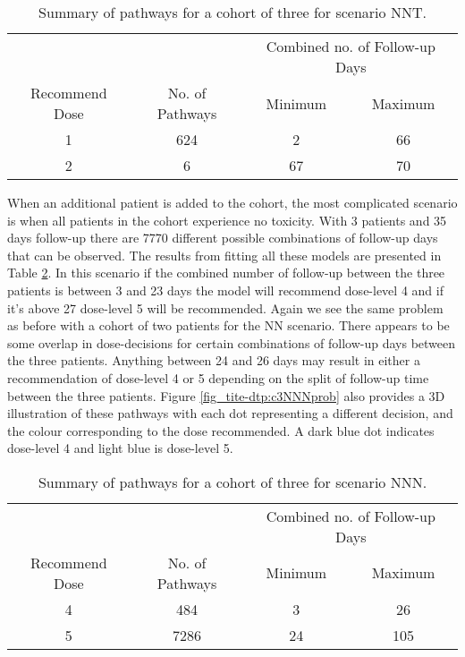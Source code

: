 \begin{table}[H]
	\centering
	\caption{Summary of pathways for a cohort of three for scenario NNT. }
	\label{tab_tite-dtp:TITEDTP_c3NNT}
	\begin{tabular}{cccc}
		\hline
		\multicolumn{1}{l}{} & \multicolumn{1}{l}{} & \multicolumn{2}{c}{Combined no. of Follow-up Days} \\ \cline{3-4} 
		Recommend Dose & No. of Pathways & Minimum & Maximum \\ \hline
		1              & 624             & 2       & 66      \\
		2              & 6               & 67      & 70      \\ \hline
	\end{tabular}
\end{table}

When an additional patient is added to the cohort, the most complicated scenario is when all patients in the cohort experience no toxicity. With 3 patients and 35 days follow-up there are 7770 different possible combinations of follow-up days that can be observed. The results from fitting all these models are presented in Table \ref{tab_tite-dtp:TITEDTP_c3NNN}. In this scenario if the combined number of follow-up between the three patients is between 3 and 23 days the model will recommend dose-level 4 and if it's above 27 dose-level 5 will be recommended. Again we see the same problem as before with a cohort of two patients for the NN scenario. There appears to be some overlap in dose-decisions for certain combinations of follow-up days between the three patients. Anything between 24 and 26 days may result in either a recommendation of dose-level 4 or 5 depending on the split of follow-up time between the three patients. Figure \ref{fig_tite-dtp:c3NNNprob} also provides a 3D illustration of these pathways with each dot representing a different decision, and the colour corresponding to the dose recommended. A dark blue dot indicates dose-level 4 and light blue is dose-level 5.  

\begin{table}[H]
	\centering
	\caption{Summary of pathways for a cohort of three for scenario NNN. }
	\label{tab_tite-dtp:TITEDTP_c3NNN}
	\begin{tabular}{cccc}
		\hline
		\multicolumn{1}{l}{} & \multicolumn{1}{l}{} & \multicolumn{2}{c}{Combined no. of Follow-up Days} \\ \cline{3-4} 
		Recommend Dose & No. of Pathways & Minimum & Maximum \\ \hline
		4              & 484             & 3       & 26      \\
		5              & 7286            & 24      & 105      \\ \hline
	\end{tabular}
\end{table}

